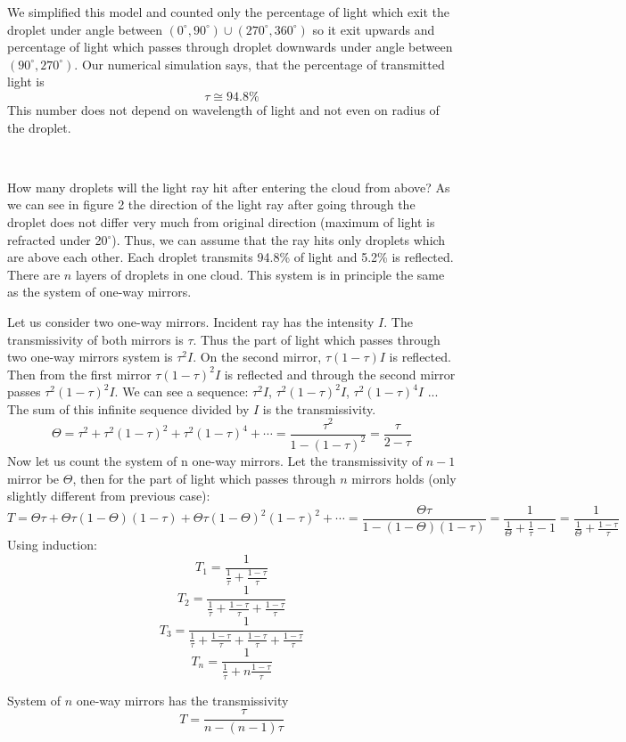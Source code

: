 \documentclass{cfp}
\begin{document}
We simplified this model and counted only the percentage of light which exit the droplet under angle between $(0^{\circ},90^{\circ})\cup(270^{\circ},360^{\circ})$ so it exit upwards and percentage of light which passes through droplet downwards under angle between $(90^{\circ},270^{\circ})$.
Our numerical simulation says, that the percentage of transmitted light is
$$\tau\cong94.8\%$$
This number does not depend on wavelength of light and not even on radius of the droplet.

\

How many droplets will the light ray hit after entering the cloud from above? As we can see in figure 2 the direction of the light ray after going through the droplet does not differ very much from original direction (maximum of light is refracted under 20$^{\circ}$). Thus, we can assume that the ray hits only droplets which are above each other. Each droplet transmits 94.8\% of light and 5.2\% is reflected. There are $n$ layers of droplets in one cloud. This system is in principle the same as the system of one-way mirrors. 

Let us consider two one-way mirrors. Incident ray has the intensity $I$. The transmissivity of both mirrors is $\tau$. Thus the part of light which passes through two one-way mirrors system is $\tau^2 I$. On the second mirror, $\tau(1-\tau) I$ is reflected. Then from the first mirror $\tau(1-\tau)^2 I$ is reflected and through the second mirror passes $\tau^2(1-\tau)^2 I$. We can see a sequence: $\tau^2 I$, $\tau^2(1-\tau)^2 I$, $\tau^2(1-\tau)^4 I$ ... The sum of this infinite sequence divided by $I$ is the transmissivity.
$$\Theta=\tau^2+\tau^2(1-\tau)^2+\tau^2(1-\tau)^4+\cdots=\frac{\tau^2}{1-(1-\tau)^2}=\frac{\tau}{2-\tau}$$
Now let us count the system of n one-way mirrors. Let the transmissivity of $n-1$ mirror be $\Theta$, then for the part of light which passes through $n$ mirrors holds (only slightly different from previous case):
$$T=\Theta\tau+\Theta\tau(1-\Theta)(1-\tau)+\Theta\tau(1-\Theta)^2(1-\tau)^2+\cdots=\frac{\Theta\tau}{1-(1-\Theta)(1-\tau)}=\frac{1}{\frac{1}{\Theta}+\frac{1}{\tau}-1}=\frac{1}{\frac{1}{\Theta}+\frac{1-\tau}{\tau}}$$
Using induction:
$$T_1=\frac{1}{\frac{1}{\tau}+\frac{1-\tau}{\tau}}$$
$$T_2=\frac{1}{\frac{1}{\tau}+\frac{1-\tau}{\tau}+\frac{1-\tau}{\tau}}$$
$$T_3=\frac{1}{\frac{1}{\tau}+\frac{1-\tau}{\tau}+\frac{1-\tau}{\tau}+\frac{1-\tau}{\tau}}$$
$$T_n=\frac{1}{\frac{1}{\tau}+n\frac{1-\tau}{\tau}}$$

System of $n$ one-way mirrors has the transmissivity
$$T=\frac{\tau}{n-\left( n-1\right) \tau}$$
\end{document}
